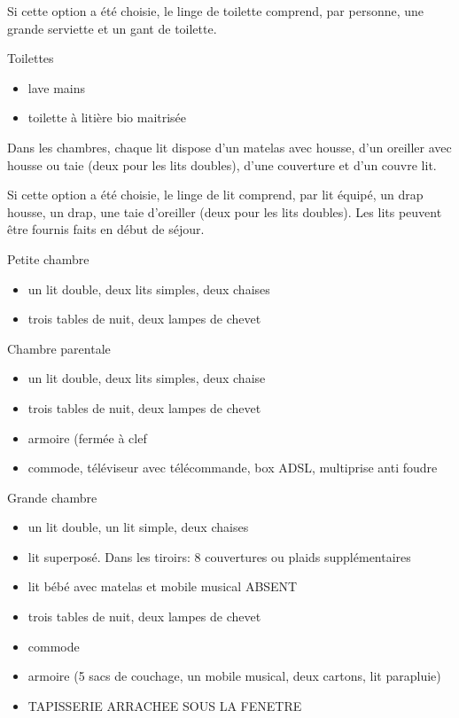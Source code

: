 \documentclass[a4paper,11pt]{article}
\begin{document}
Si cette option a été choisie, le linge de toilette comprend, par personne, une grande serviette et un gant de toilette.
\vspace{0.5cm}

Toilettes
\begin{itemize}
\item lave mains
\item toilette à litière bio maitrisée
\end{itemize}


\vspace{0.25cm}

Dans les chambres, chaque lit dispose d'un matelas avec housse, d'un oreiller avec housse ou taie (deux pour les lits doubles),  d'une couverture et d'un couvre lit.

Si cette option a été choisie, le linge de lit comprend, par lit équipé, un drap housse, un drap, une taie d'oreiller (deux pour les lits doubles). Les lits peuvent être fournis faits en début de séjour.
\vspace{0.5cm}

Petite chambre
\begin{itemize}
\item un lit double, deux lits simples, deux chaises
\item trois tables de nuit, deux lampes de chevet 
\end{itemize}
\vspace{0.25cm}

Chambre parentale
\begin{itemize}
\item un lit double, deux lits simples, deux chaise
\item trois tables de nuit, deux lampes de chevet 
\item armoire (fermée à clef
\item commode, téléviseur avec télécommande, box ADSL, multiprise anti foudre
\end{itemize}

\vspace{0.5cm}

Grande chambre
\begin{itemize}
\item un lit double, un lit simple, deux chaises
\item lit superposé. Dans les tiroirs: 8 couvertures ou plaids supplémentaires
\item lit bébé avec matelas et mobile musical ABSENT
\item trois tables de nuit, deux lampes de chevet
\item commode
\item armoire (5 sacs de couchage, un mobile musical, deux cartons, lit parapluie)
\item TAPISSERIE ARRACHEE SOUS LA FENETRE
\end{itemize}
\end{document}
